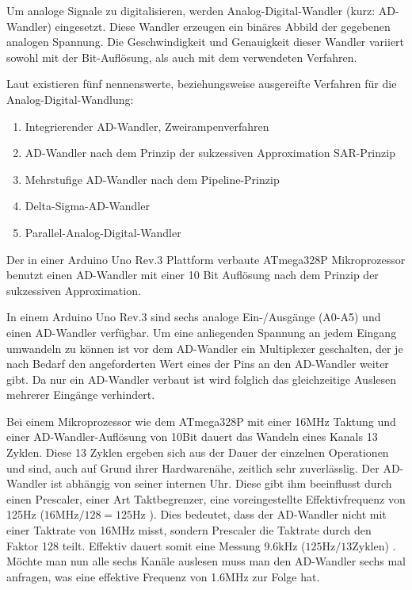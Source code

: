 Um analoge Signale zu digitalisieren, werden Analog-Digital-Wandler (kurz: AD-Wandler) eingesetzt. Diese Wandler erzeugen ein binäres Abbild der gegebenen analogen Spannung. Die Geschwindigkeit und Genauigkeit dieser Wandler variiert sowohl mit der Bit-Auflösung, als auch mit dem verwendeten Verfahren.

Laut \cite{heringelektronik2014} existieren fünf nennenswerte, beziehungsweise ausgereifte Verfahren für die Analog-Digital-Wandlung:
\begin{enumerate}
 \item Integrierender AD-Wandler, Zweirampenverfahren
 \item AD-Wandler nach dem Prinzip der sukzessiven Approximation SAR-Prinzip
 \item Mehrstufige AD-Wandler nach dem Pipeline-Prinzip
 \item Delta-Sigma-AD-Wandler
 \item Parallel-Analog-Digital-Wandler
\end{enumerate}

Der in einer Arduino Uno Rev.3 Plattform verbaute ATmega328P Mikroprozessor\cite{arduino2015} benutzt einen AD-Wandler mit einer 10 Bit Auflösung nach dem Prinzip der sukzessiven Approximation\cite{atmelcorporationatmega48apa88apa168apa328p2014}\cite{yatesarduinos2014}.

In einem Arduino Uno Rev.3 sind sechs analoge Ein-/Ausgänge (A0-A5)\cite{arduino2015} und einen AD-Wandler\cite{atmelcorporationatmega48apa88apa168apa328p2014} verfügbar. Um eine anliegenden Spannung an jedem Eingang umwandeln zu können ist vor dem AD-Wandler ein Multiplexer geschalten, der je nach Bedarf den angeforderten Wert eines der Pins an den AD-Wandler weiter gibt. Da nur ein AD-Wandler verbaut ist wird folglich das gleichzeitige Auslesen mehrerer Eingänge verhindert.

Bei einem Mikroprozessor wie dem ATmega328P mit einer 16MHz Taktung und einer AD-Wandler-Auflösung von 10Bit dauert das Wandeln eines Kanals 13 Zyklen. Diese 13 Zyklen ergeben sich aus der Dauer der einzelnen Operationen und sind, auch auf Grund ihrer Hardwarenähe, zeitlich sehr zuverlässlig\cite{atmelcorporationatmega48apa88apa168apa328p2014}.
Der AD-Wandler ist abhängig von seiner internen Uhr. Diese gibt ihm beeinflusst durch einen Prescaler, einer Art Taktbegrenzer, eine voreingestellte Effektivfrequenz von 125Hz ($16\text{MHz} / 128 = 125\text{Hz}$ ). Dies bedeutet, dass der AD-Wandler nicht mit einer Taktrate von 16MHz misst, sondern Prescaler die Taktrate durch den Faktor 128 teilt\cite{atmelcorporationatmega48apa88apa168apa328p2014}.
Effektiv dauert somit eine Messung 9.6kHz ($125\text{Hz} / 13\text{Zyklen}$) . Möchte man nun alle sechs Kanäle auslesen muss man den AD-Wandler sechs mal anfragen, was eine effektive Frequenz von 1.6MHz zur Folge hat.

